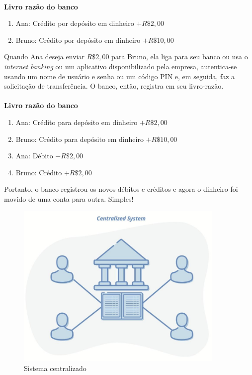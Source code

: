 \paragraph{}
\textbf{Livro razão do banco}

\begin{samepage}
\begin{enumerate}
\item Ana: Crédito por depósito em dinheiro $+R\$2,00$ 
\item Bruno: Crédito por depósito em dinheiro $+R\$10,00$
\end{enumerate}
\end{samepage}

Quando Ana deseja enviar $R\$2,00$ para Bruno, ela liga para seu banco ou usa o \textit{internet banking} ou um aplicativo disponibilizado pela empresa, autentica-se usando um nome de usuário e senha ou um código PIN e, em seguida, faz a solicitação de transferência. O banco, então, registra em seu livro-razão.

\paragraph{}
\textbf{Livro razão do banco}

\begin{samepage}
\begin{enumerate}
\item Ana: Crédito para depósito em dinheiro $+R\$2,00$
\item Bruno: Crédito para depósito em dinheiro $+R\$10,00$
\item Ana: Débito $-R\$2,00$
\item Bruno: Crédito $+R\$2,00$
\end{enumerate}
\end{samepage}

Portanto, o banco registrou os novos débitos e créditos e agora o dinheiro foi movido de uma conta para outra. Simples!
\newpage
\begin{figure}
  \centering
  \includegraphics[width=10cm]{imagens/centralizado-capitulo-02.jpg}
  \caption{Sistema centralizado}
\end{figure}


